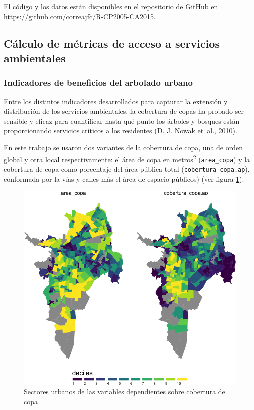 \documentclass[12pt,a4paper,openany]{book}
\theoremstyle{definition}
\theoremstyle{definition}
\theoremstyle{definition}
\theoremstyle{remark}
\begin{document}
El código y los datos están disponibles en el
\href{https://github.com/correajfc/R-CP2005-CA2015}{repositorio de
GitHub} en \url{https://github.com/correajfc/R-CP2005-CA2015}.

\subsection{Cálculo de métricas de acceso a servicios
ambientales}\label{calculo-de-metricas-de-acceso-a-servicios-ambientales}

\subsubsection{Indicadores de beneficios del arbolado
urbano}\label{indicadores-de-beneficios-del-arbolado-urbano}

Entre los distintos indicadores desarrollados para capturar la extensión
y distribución de los servicios ambientales, la cobertura de copas ha
probado ser sensible y eficaz para cuantificar hasta qué punto los
árboles y bosques están proporcionando servicios críticos a los
residentes (D. J. Nowak et~al.,
\protect\hyperlink{ref-nowak_sustaining_2010}{2010}).

En este trabajo se usaron dos variantes de la cobertura de copa, una de
orden global y otra local respectivamente: el área de copa en
metros\textsuperscript{2} (\texttt{area\_copa}) y la cobertura de copa
como porcentaje del área pública total (\texttt{cobertura\_copa.ap}),
conformada por la vías y calles más el área de espacio públicos) (ver
figura \ref{fig:mapa-copa-dep}).

\begin{figure}

{\centering \includegraphics[width=1\linewidth]{tesis-unigis_files/figure-latex/mapa-copa-dep-1} 

}

\caption{Sectores urbanos de las variables dependientes sobre cobertura de copa}\label{fig:mapa-copa-dep}
\end{figure}
\end{document}
